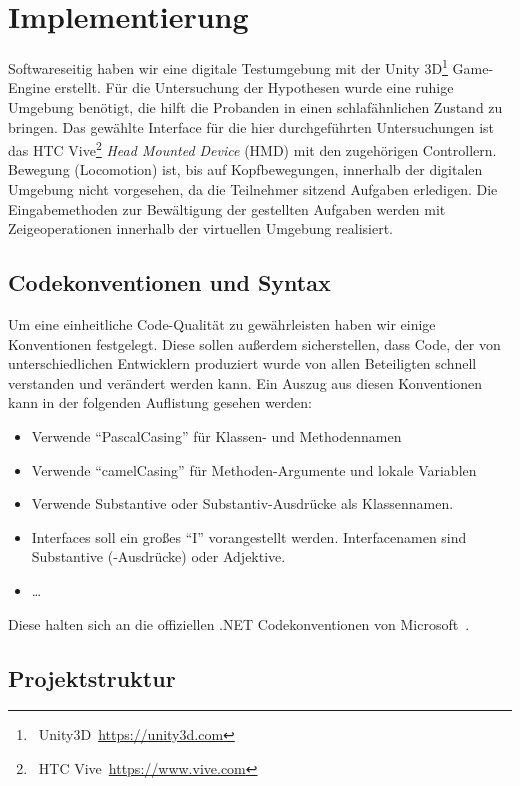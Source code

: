 \section{Implementierung}

Softwareseitig haben wir eine digitale Testumgebung mit der Unity 3D\footnote{~Unity3D~\url{https://unity3d.com}} Game-Engine erstellt. Für die Untersuchung der Hypothesen wurde eine ruhige Umgebung benötigt, die hilft die Probanden in einen schlafähnlichen Zustand zu bringen. 
Das gewählte Interface für die hier durchgeführten Untersuchungen ist das HTC Vive\footnote{~HTC Vive~\url{https://www.vive.com}} \textit{Head Mounted Device} (HMD) mit den zugehörigen Controllern. 
Bewegung (Locomotion) ist, bis auf Kopfbewegungen, innerhalb der digitalen Umgebung nicht vorgesehen, da die Teilnehmer sitzend Aufgaben erledigen. 
Die Eingabemethoden zur Bewältigung der gestellten Aufgaben werden mit Zeigeoperationen innerhalb der virtuellen Umgebung realisiert. 

\subsection{Codekonventionen und Syntax}

Um eine einheitliche Code-Qualität zu gewährleisten haben wir einige Konventionen festgelegt. Diese sollen außerdem sicherstellen, dass Code, der von unterschiedlichen Entwicklern produziert wurde von allen Beteiligten schnell verstanden und verändert werden kann.
Ein Auszug aus diesen Konventionen kann in der folgenden Auflistung gesehen werden: 
\begin{itemize}
    \item Verwende "`PascalCasing"' für Klassen- und Methodennamen
    \item Verwende "`camelCasing"' für Methoden-Argumente und lokale Variablen
    \item Verwende Substantive oder Substantiv-Ausdrücke als Klassennamen.
    \item Interfaces soll ein großes "`I"' vorangestellt werden. Interfacenamen sind Substantive (-Ausdrücke) oder Adjektive.
    \item \ldots
\end{itemize}

Diese halten sich an die offiziellen .NET Codekonventionen von Microsoft~\cite{online:condeConventions}.

\subsection{Projektstruktur}

